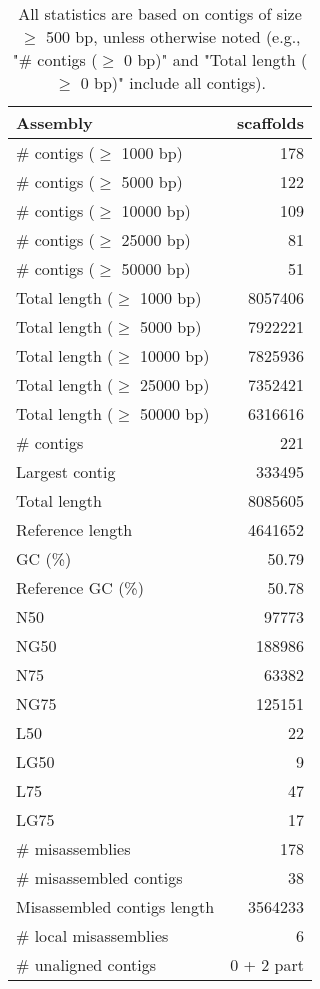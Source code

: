 \documentclass[12pt,a4paper]{article}
\begin{document}
\begin{table}[ht]
\begin{center}
\caption{All statistics are based on contigs of size $\geq$ 500 bp, unless otherwise noted (e.g., "\# contigs ($\geq$ 0 bp)" and "Total length ($\geq$ 0 bp)" include all contigs).}
\begin{tabular}{|l*{1}{|r}|}
\hline
Assembly & scaffolds \\ \hline
\# contigs ($\geq$ 1000 bp) & 178 \\ \hline
\# contigs ($\geq$ 5000 bp) & 122 \\ \hline
\# contigs ($\geq$ 10000 bp) & 109 \\ \hline
\# contigs ($\geq$ 25000 bp) & 81 \\ \hline
\# contigs ($\geq$ 50000 bp) & 51 \\ \hline
Total length ($\geq$ 1000 bp) & 8057406 \\ \hline
Total length ($\geq$ 5000 bp) & 7922221 \\ \hline
Total length ($\geq$ 10000 bp) & 7825936 \\ \hline
Total length ($\geq$ 25000 bp) & 7352421 \\ \hline
Total length ($\geq$ 50000 bp) & 6316616 \\ \hline
\# contigs & 221 \\ \hline
Largest contig & 333495 \\ \hline
Total length & 8085605 \\ \hline
Reference length & 4641652 \\ \hline
GC (\%) & 50.79 \\ \hline
Reference GC (\%) & 50.78 \\ \hline
N50 & 97773 \\ \hline
NG50 & 188986 \\ \hline
N75 & 63382 \\ \hline
NG75 & 125151 \\ \hline
L50 & 22 \\ \hline
LG50 & 9 \\ \hline
L75 & 47 \\ \hline
LG75 & 17 \\ \hline
\# misassemblies & 178 \\ \hline
\# misassembled contigs & 38 \\ \hline
Misassembled contigs length & 3564233 \\ \hline
\# local misassemblies & 6 \\ \hline
\# unaligned contigs & 0 + 2 part \\ \hline

\end{tabular}
\end{center}
\end{table}
\end{document}
